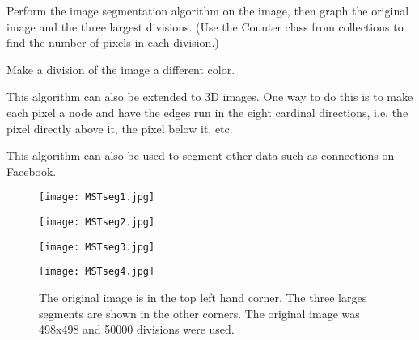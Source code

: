 \begin{problem}
Perform the image segmentation algorithm on the image, then graph the original image and the three largest divisions.
(Use the Counter class from collections to find the number of pixels in each division.) 
\end{problem}

\begin{problem}
Make a division of the image a different color.
\end{problem}

This algorithm can also be extended to 3D images.
One way to do this is to make each pixel a node and have the edges run in the eight cardinal directions, i.e. the pixel directly above it, the pixel below it, etc.

This algorithm can also be used to segment other data such as connections on Facebook. 

\vfill
\begin{figure}[ht]
\begin{minipage}[b]{0.47\linewidth}
\centering
\texttt{[image: MSTseg1.jpg]}
\end{minipage}
\hspace{0.5cm}
\begin{minipage}[b]{0.47\linewidth}
\centering
\texttt{[image: MSTseg2.jpg]}
\end{minipage}
\begin{minipage}[b]{0.47\linewidth}
\centering
\texttt{[image: MSTseg3.jpg]}
\end{minipage}
\hspace{0.5cm}
\begin{minipage}[b]{0.47\linewidth}
\centering
\texttt{[image: MSTseg4.jpg]}
\end{minipage}
\caption{The original image is in the top left hand corner. The three larges segments are shown in the other corners. The original image was 498x498 and 50000 divisions were used.}
\end{figure}
\vfill
